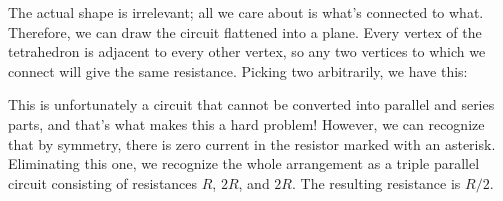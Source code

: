 The actual shape is irrelevant; all we care about is
what's connected to what. Therefore, we can draw the circuit
flattened into a plane. Every vertex of the tetrahedron is
adjacent to every other vertex, so any two vertices to which
we connect will give the same resistance. Picking two
arbitrarily, we have this:


This is unfortunately a circuit that cannot be converted
into parallel and series parts, and that's what makes this a
hard problem! However, we can recognize that by symmetry,
there is zero current in the resistor marked with an
asterisk. Eliminating this one, we recognize the whole
arrangement as a triple parallel circuit consisting of
resistances $R$, $2R$, and $2R$. The resulting resistance is $R/2$.
